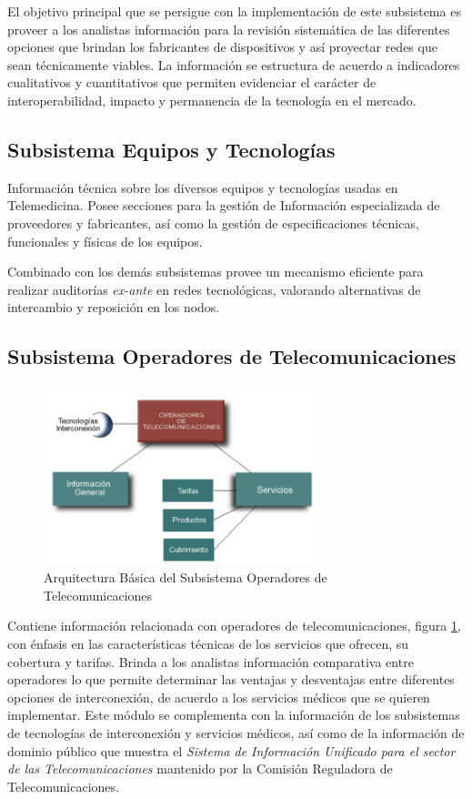 El objetivo principal que se persigue con la implementación de este subsistema es proveer a los analistas información para la revisión sistemática de las diferentes opciones que brindan los fabricantes de dispositivos y así proyectar redes que sean técnicamente viables. La información se estructura de acuerdo a indicadores cualitativos y cuantitativos que permiten evidenciar el carácter de interoperabilidad, impacto y permanencia de la tecnología en el mercado. 

\subsection{Subsistema Equipos y Tecnologías}
Información técnica sobre los diversos equipos y tecnologías usadas en Telemedicina. Posee secciones para la gestión de Información especializada de proveedores y fabricantes, así como la gestión de especificaciones técnicas, funcionales y físicas de los equipos.

Combinado con los demás subsistemas provee un mecanismo eficiente para realizar auditorías \textit{ex-ante} en redes tecnológicas, valorando alternativas de intercambio y reposición en los nodos.

\subsection{Subsistema Operadores de Telecomunicaciones}

\begin{figure}
 \centering
 \includegraphics[width=80mm, height=52mm]{operadores.png}
 \caption{Arquitectura Básica del Subsistema Operadores de Telecomunicaciones}
 \label{operadores}
\end{figure}

Contiene información relacionada con operadores de telecomunicaciones, figura \ref{operadores}, con énfasis en las características técnicas de los servicios que ofrecen, su cobertura y tarifas. Brinda a los analistas información comparativa entre operadores lo que permite determinar las ventajas y desventajas entre diferentes opciones de interconexión, de acuerdo a los servicios médicos que se quieren implementar. Este módulo se complementa con la información de los subsistemas de tecnologías de interconexión y servicios médicos, así como de la información de dominio público que muestra el \textit{Sistema de Información Unificado para el sector de las Telecomunicaciones} mantenido por la Comisión Reguladora de Telecomunicaciones.

